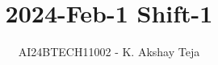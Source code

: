 \documentclass[journal,9pt,onecolumn]{IEEEtran}
\begin{document}

\vspace{3cm}

\title{2024-Feb-1 Shift-1}
\author{AI24BTECH11002 - K. Akshay Teja}
{\let\newpage\relax\maketitle}

\renewcommand{\thefigure}{\theenumi}
\renewcommand{\thetable}{\theenumi}
\setlength{\intextsep}{10pt} %

\renewcommand{\thetable}{\theenumi}
\end{document}
